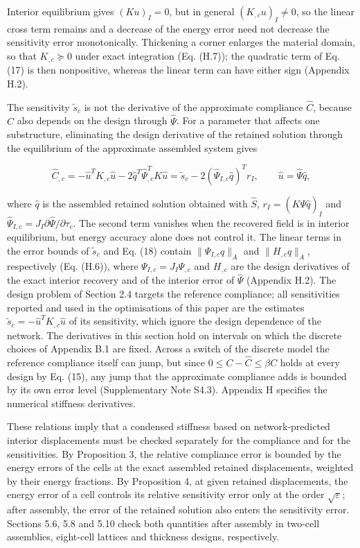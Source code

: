 \documentclass[preprint,12pt,authoryear]{elsarticle}
\begin{document}
Interior equilibrium gives \((Ku)_I=0\), but in general \((K_{,c}u)_I\ne0\), so the linear cross term remains and a decrease of the energy error need not decrease the sensitivity error monotonically. Thickening a corner enlarges the material domain, so that \(K_{,c}\succeq0\) under exact integration (Eq. (H.7)); the quadratic term of Eq. (17) is then nonpositive, whereas the linear term can have either sign (Appendix H.2).

The sensitivity \(\widetilde s_c\) is not the derivative of the approximate compliance \(\widehat C\), because \(\widehat C\) also depends on the design through \(\widehat\Psi\). For a parameter that affects one substructure, eliminating the design derivative of the retained solution through the equilibrium of the approximate assembled system gives

\[
\widehat C_{,c}
=-\widehat u^TK_{,c}\widehat u
 -2\widehat q^T\widehat\Psi_{,c}^TK\widehat u
=\widetilde s_c-2(\widehat\Psi_{I,c}\widehat q)^Tr_I,
\qquad\widehat u=\widehat\Psi\widehat q,
\tag{18}
\]

where \(\widehat q\) is the assembled retained solution obtained with \(\widehat S\), \(r_I=(K\widehat\Psi\widehat q)_I\) and \(\widehat\Psi_{I,c}=J_I\partial \widehat\Psi/\partial\tau_c\). The second term vanishes when the recovered field is in interior equilibrium, but energy accuracy alone does not control it. The linear terms in the error bounds of \(\widetilde s_c\) and Eq. (18) contain \(\|\Psi_{I,c}q\|_A\) and \(\|H_{,c}q\|_A\), respectively (Eq. (H.6)), where \(\Psi_{I,c}=J_I\Psi_{,c}\) and \(H_{,c}\) are the design derivatives of the exact interior recovery and of the interior error of \(\widehat\Psi\) (Appendix H.2). The design problem of Section 2.4 targets the reference compliance; all sensitivities reported and used in the optimisations of this paper are the estimates \(\widetilde s_c=-\widehat u^TK_{,c}\widehat u\) of its sensitivity, which ignore the design dependence of the network. The derivatives in this section hold on intervals on which the discrete choices of Appendix B.1 are fixed. Across a switch of the discrete model the reference compliance itself can jump, but since \(0\le C-\widehat C\le\beta C\) holds at every design by Eq. (15), any jump that the approximate compliance adds is bounded by its own error level (Supplementary Note S4.3). Appendix H specifies the numerical stiffness derivatives.

These relations imply that a condensed stiffness based on network-predicted interior displacements must be checked separately for the compliance and for the sensitivities. By Proposition 3, the relative compliance error is bounded by the energy errors of the cells at the exact assembled retained displacements, weighted by their energy fractions. By Proposition 4, at given retained displacements, the energy error of a cell controls its relative sensitivity error only at the order \(\sqrt\varepsilon\); after assembly, the error of the retained solution also enters the sensitivity error. Sections 5.6, 5.8 and 5.10 check both quantities after assembly in two-cell assemblies, eight-cell lattices and thickness designs, respectively.
\end{document}
